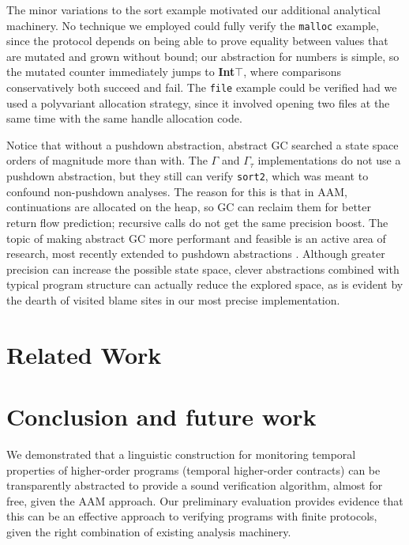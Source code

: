 The minor variations to the sort example motivated our additional analytical machinery.
%
No technique we employed could fully verify the {\tt malloc} example, since the protocol depends on being able to prove equality between values that are mutated and grown without bound; our abstraction for numbers is simple, so the mutated counter immediately jumps to \textbf{Int}$\top$, where comparisons conservatively both succeed and fail.
%
The {\tt file} example could be verified had we used a polyvariant allocation strategy, since it involved opening two files at the same time with the same handle allocation code.

Notice that without a pushdown abstraction, abstract GC searched a state space orders of magnitude more than with.
%
The $\Gamma$ and $\Gamma_\tau$ implementations do not use a pushdown abstraction, but they still can verify {\tt sort2}, which was meant to confound non-pushdown analyses.
%
The reason for this is that in AAM, continuations are allocated on the heap, so GC can reclaim them for better return flow prediction; recursive calls do not get the same precision boost.
%
The topic of making abstract GC more performant and feasible is an active area of research, most recently extended to pushdown abstractions \citep{dvanhorn:Earl2012Introspective}.
%
Although greater precision can increase the possible state space, clever abstractions combined with typical program structure can actually reduce the explored space, as is evident by the dearth of visited blame sites in our most precise implementation.

\section{Related Work}\label{sec:related}


\section{Conclusion and future work} \label{sec:conclusion}

We demonstrated that a linguistic construction for monitoring temporal properties of higher-order programs (temporal higher-order contracts) can be transparently abstracted to provide a sound verification algorithm, almost for free, given the AAM approach.
%
Our preliminary evaluation provides evidence that this can be an effective approach to verifying programs with finite protocols, given the right combination of existing analysis machinery.


